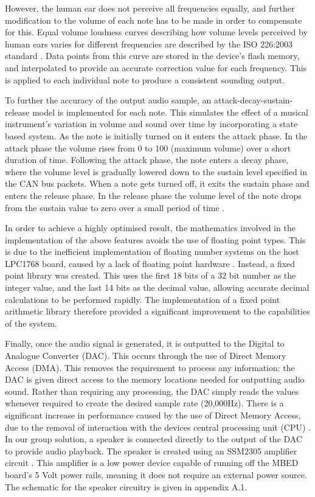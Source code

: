 However, the human ear does not perceive all frequencies equally, and further 
modification to the volume of each note has to be made in order to compensate 
for this. Equal volume loudness curves describing how volume levels perceived by 
human ears varies for different frequencies are described 
by the ISO 226:2003 standard \cite{iso-226}. 
Data points from this curve are stored in the device's flash memory, and 
interpolated to provide an accurate correction value for each frequency. This is 
applied to each individual note to produce a consistent sounding output. 
\par\bigskip\noindent
To further the accuracy of the output audio sample, an attack-decay-sustain-release 
model is implemented for each note. This simulates the effect of a musical 
instrument's variation in volume and sound over time by incorporating a state 
based system. As the note is initially turned on it enters the attack phase. 
In the attack phase the volume rises from 0 to 100 (maximum volume) over a 
short duration of time.
Following the attack phase, the note enters a decay phase, where the volume level 
is gradually lowered down to the sustain level specified in the CAN bus packets. 
When a note gets turned off, it exits the sustain phase and enters the release phase. 
In the release phase the volume level of the note drops from the sustain value to 
zero over a small period of time \cite{asr-book}. 
\par\bigskip\noindent
In order to achieve a highly optimised result, the mathematics involved in the 
implementation of the above features avoids the use of floating point types. 
This is due to the inefficient implementation of floating number systems on the 
host LPC1768 board, caused by a lack of floating point hardware 
\cite{kormanyos2013real, lpc1768-datasheet}.
Instead, a fixed point library was created. This uses the first 18 bits of a 
32 bit number as the integer value, and the last 14 bits as the decimal value, 
allowing accurate decimal calculations to be performed rapidly. 
The implementation of a fixed point arithmetic library therefore provided a 
significant improvement to the capabilities of the system. 
\par\bigskip\noindent
Finally, once the audio signal is generated, it is outputted to the Digital to 
Analogue Converter (DAC). This occurs through the use of Direct Memory Access (DMA).
This removes the requirement to process any information: the DAC is given 
direct access to the memory locations needed for outputting audio sound. Rather 
than requiring any processing, the DAC simply reads the values whenever required 
to create the desired sample rate (20,000Hz).
There is a significant increase in performance caused by the use of Direct Memory 
Access, due to the removal of interaction with the devices central processing unit
(CPU) \cite{barr1999programming}. 
In our group solution, a speaker is connected directly to the output of the DAC 
to provide audio playback. 
The speaker is created using an SSM2305 amplifier circuit \cite{speaker}. This 
amplifier is a low power device capable of running off the MBED board's 
5 Volt power rails, meaning it does not require an external power source. 
The schematic for the speaker circuitry is given in appendix A.1. 

